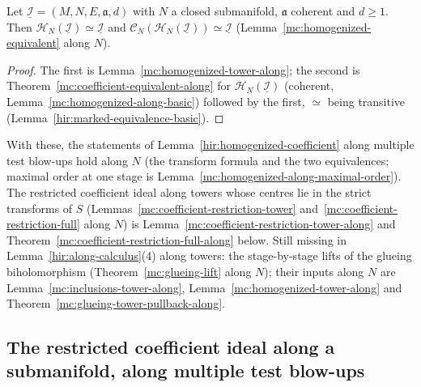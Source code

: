 \begin{theorem}
\label{mc:homogenized-equivalent-along}
\leanok
Let \(\underline{\mathcal I}=(M,N,E,\mathfrak a,d)\) with \(N\) a closed submanifold, \(\mathfrak a\) coherent and \(d\ge1\). Then
\(\mathcal H_N(\underline{\mathcal I})\simeq\underline{\mathcal I}\) and \(\mathcal C_N(\mathcal H_N(\underline{\mathcal I}))\simeq\underline{\mathcal I}\) (Lemma~\ref{mc:homogenized-equivalent} along \(N\)).
\end{theorem}
\begin{proof}
\leanok
The first is Lemma~\ref{mc:homogenized-tower-along}; the second is Theorem~\ref{mc:coefficient-equivalent-along} for \(\mathcal H_N(\underline{\mathcal I})\) (coherent,
Lemma~\ref{mc:homogenized-along-basic}) followed by the first, \(\simeq\) being transitive (Lemma~\ref{hir:marked-equivalence-basic}).
\end{proof}
With these, the statements of Lemma~\ref{hir:homogenized-coefficient} along multiple test blow-ups hold along \(N\) (the transform formula and the two equivalences;
maximal order at one stage is Lemma~\ref{mc:homogenized-along-maximal-order}). The restricted coefficient ideal along towers whose centres lie in the strict
transforms of \(S\) (Lemmas~\ref{mc:coefficient-restriction-tower} and~\ref{mc:coefficient-restriction-full} along \(N\)) is Lemma~\ref{mc:coefficient-restriction-tower-along}
and Theorem~\ref{mc:coefficient-restriction-full-along} below. Still missing in Lemma~\ref{hir:along-calculus}(4) along towers: the stage-by-stage lifts of the
glueing biholomorphism (Theorem~\ref{mc:glueing-lift} along \(N\)); their inputs along \(N\) are Lemma~\ref{mc:inclusions-tower-along},
Lemma~\ref{mc:homogenized-tower-along} and Theorem~\ref{mc:glueing-tower-pullback-along}.

\subsection{The restricted coefficient ideal along a submanifold, along multiple test blow-ups}

